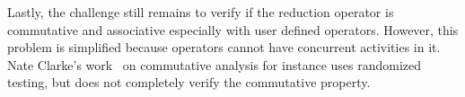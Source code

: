 \documentclass[10pt, conference, compsocconf]{IEEEtran}
\begin{document}
Lastly, the challenge still remains to verify if the reduction operator
is commutative and associative especially with user defined operators.
However, this problem is simplified because operators cannot
have concurrent activities in it.
Nate Clarke's work~\cite{aleen2009commutativity} on commutative
analysis for instance uses randomized testing, but does not completely
verify the commutative property.





\end{document}
